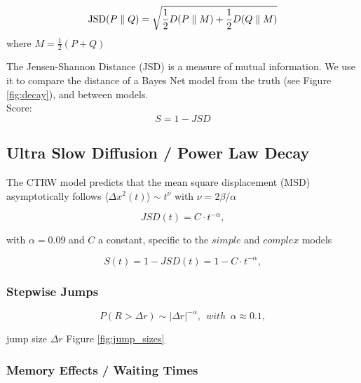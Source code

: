 \begin{equation}
{\rm JSD}(P \parallel Q)= \sqrt{\frac{1}{2}D(P \parallel M)+\frac{1}{2}D(Q \parallel M)}
\end{equation}
where $M=\frac{1}{2}(P+Q)$


The Jensen-Shannon Distance (JSD) is a measure of mutual information. We use it to compare the distance of a Bayes Net model from the truth (see Figure \ref{fig:decay}), and between models.\\


Score:
\begin{equation}
S = 1 - JSD
\end{equation}



\subsection{Ultra Slow Diffusion / Power Law Decay}

The CTRW model predicts that the mean square displacement (MSD) asymptotically follows $\langle \Delta x^2 (t) \rangle \sim t^{\nu}$ with $\nu = 2\beta /\alpha$

\begin{equation}
\label{power_law_decay}
JSD(t) = C \cdot t^{-\alpha},
\end{equation}

with $\alpha = 0.09$ and $C$ a constant, specific to the $simple$ and $complex$ models

\begin{equation}
\label{ultraslowdiffusion}
S(t) = 1 - JSD(t) = 1- C \cdot t^{-\alpha},
\end{equation}


\subsubsection{Stepwise Jumps}

\begin{equation}
P(R > \Delta r) \sim |\Delta r|^{-\alpha}, ~~with~~\alpha \approx 0.1,
\end{equation}

jump size $\Delta r$ Figure \ref{fig:jump_sizes}



\subsubsection{Memory Effects / Waiting Times}

